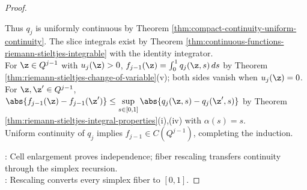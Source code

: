 \begin{proposition}
\begin{proof}
\begin{enumerate}[label=(\roman*)]
Thus $q_j$ is uniformly continuous by Theorem \ref{thm:compact-continuity-uniform-continuity}. The slice integrals exist by Theorem \ref{thm:continuous-functions-riemann-stieltjes-integrable} with the identity integrator.\\
For $\z\in Q^{j-1}$ with $u_j(\z)>0$, $f_{j-1}(\z)=\int_0^1q_j(\z,s)\,ds$ by Theorem \ref{thm:riemann-stieltjes-change-of-variable}(v); both sides vanish when $u_j(\z)=0$.\\
For $\z,\z'\in Q^{j-1}$, $\abs{f_{j-1}(\z)-f_{j-1}(\z')}\leq\sup\limits_{s\in[0,1]}\abs{q_j(\z,s)-q_j(\z',s)}$ by Theorem \ref{thm:riemann-stieltjes-integral-properties}(i),(iv) with $\alpha(s)=s$.\\
Uniform continuity of $q_j$ implies $f_{j-1}\in C(Q^{j-1})$, completing the induction.
\end{enumerate}
: Cell enlargement proves independence; fiber rescaling transfers continuity through the simplex recursion.\\
: Rescaling converts every simplex fiber to $[0,1]$.
\end{proof}
\end{proposition}

